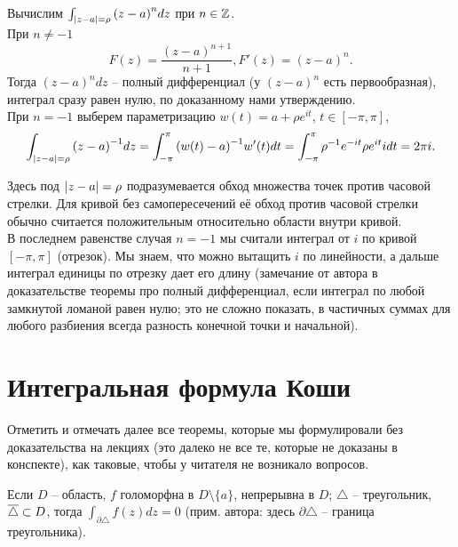 \begin{example}
	Вычислим $\int_{\mathopen{}\left\lvert z - a\right\rvert\mathclose{} = \rho} {(z - a)}^n dz$ при $n \in \mathbb{Z}$. \\
	При $n \neq -1$
	\[
		F(z) = \frac{{(z - a)}^{n + 1}}{n + 1}, F'(z) = {(z - a)}^n.
	\]
	Тогда ${(z - a)}^n dz$ -- полный дифференциал (у ${(z - a)}^n$ есть первообразная), интеграл сразу равен нулю, по доказанному нами утверждению. \\
	При $n = -1$ выберем параметризацию $w(t) = a + \rho e^{it}$, $t \in [-\pi, \pi]$,
	\[
		\int_{\mathopen{}\left\lvert z - a\right\rvert\mathclose{} = \rho} {(z - a)}^{-1} dz = \int_{-\pi}^\pi {(w(t) - a)}^{-1} w'(t) dt = \int_{-\pi}^\pi \rho^{-1} e^{-it} \rho e^{it} i dt = 2 \pi i.
	\]
\end{example}
\begin{anote}
	Здесь под $\mathopen{}\left\lvert z - a\right\rvert\mathclose{} = \rho$ подразумевается обход множества точек против часовой стрелки. Для кривой без самопересечений её обход против часовой стрелки обычно считается положительным относительно области внутри кривой. \\
	В последнем равенстве случая $n = -1$ мы считали интеграл от $i$ по кривой $[-\pi, \pi]$ (отрезок). Мы знаем, что можно вытащить $i$ по линейности, а дальше интеграл единицы по отрезку дает его длину (замечание от автора в доказательстве теоремы про полный дифференциал, если интеграл по любой замкнутой ломаной равен нулю; это не сложно показать, в частичных суммах для любого разбиения всегда разность конечной точки и начальной).
\end{anote}

\section{Интегральная формула Коши}

{\color{red} Отметить и отмечать далее все теоремы, которые мы формулировали без доказательства на лекциях (это далеко не все те, которые не доказаны в конспекте), как таковые, чтобы у читателя не возникало вопросов.}

\begin{theorem}
	Если $D$ -- область, $f$ голоморфна в $D \setminus \{ a \}$, непрерывна в $D$; $\triangle$ -- треугольник, $\overline \triangle \subset D$, тогда $\int_{\partial \triangle} f(z) dz = 0$ (прим. автора: здесь $\partial \triangle$ -- граница треугольника).
\end{theorem}
